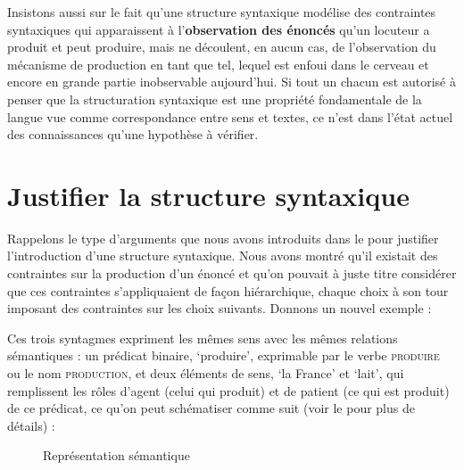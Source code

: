 Insistons aussi sur le fait qu’une structure syntaxique modélise des contraintes syntaxiques qui apparaissent à l’\textbf{observation des énoncés} qu’un locuteur a produit et peut produire, mais ne découlent, en aucun cas, de l’observation du mécanisme de production en tant que tel, lequel est enfoui dans le cerveau et encore en grande partie inobservable aujourd’hui. Si tout un chacun est autorisé à penser que la structuration syntaxique est une propriété fondamentale de la langue vue comme correspondance entre sens et textes, ce n’est dans l’état actuel des connaissances qu’une hypothèse à vérifier.

\section{Justifier la structure syntaxique}\label{sec:3.2.1}

Rappelons le type d’arguments que nous avons introduits dans le  pour justifier l’introduction d’une structure syntaxique. Nous avons montré qu’il existait des contraintes sur la production d’un énoncé et qu’on pouvait à juste titre considérer que ces contraintes s’appliquaient de façon hiérarchique, chaque choix à son tour imposant des contraintes sur les choix suivants. Donnons un nouvel exemple :

\z

\z

\z

Ces trois syntagmes expriment les mêmes sens avec les mêmes relations sémantiques : un prédicat binaire, ‘produire’, exprimable par le verbe \textsc{produire} ou le nom \textsc{production,} et deux éléments de sens, ‘la France’ et ‘lait’, qui remplissent les rôles d’agent (celui qui produit) et de patient (ce qui est produit) de ce prédicat, ce qu’on peut schématiser comme suit (voir le  pour plus de détails) :

\begin{figure}
\caption{\label{fig:}Représentation sémantique}
\end{figure}

